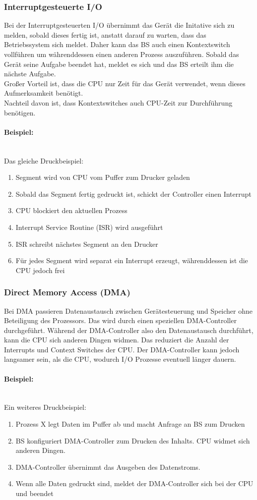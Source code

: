 \documentclass{article}
\newcommand{\paragraphlb}[1]{\paragraph{#1}\mbox{}\\}
\begin{document}
	\subsubsection{Interruptgesteuerte I/O}
	Bei der Interruptgesteuerten I/O übernimmt das Gerät die Initative sich zu melden, sobald dieses fertig ist, anstatt darauf zu warten, dass das Betriebssystem sich meldet. Daher kann das BS auch einen Kontextswitch vollführen um währenddessen einen anderen Prozess auszuführen. Sobald das Gerät seine Aufgabe beendet hat, meldet es sich und das BS erteilt ihm die nächste Aufgabe. \\
	Großer Vorteil ist, dass die CPU nur Zeit für das Gerät verwendet, wenn dieses Aufmerksamkeit benötigt. \\
	Nachteil davon ist, dass Kontextswitches auch CPU-Zeit zur Durchführung benötigen. 
	\paragraphlb{Beispiel:}
	Das gleiche Druckbeispiel:
	\begin{enumerate}
		\item{Segment wird von CPU vom Puffer zum Drucker geladen}
		\item{Sobald das Segment fertig gedruckt ist, schickt der Controller einen Interrupt}
		\item{CPU blockiert den aktuellen Prozess}
		\item{Interrupt Service Routine (ISR) wird ausgeführt}
		\item{ISR schreibt nächstes Segment an den Drucker}
		\item{Für jedes Segment wird separat ein Interrupt erzeugt, währenddessen ist die CPU jedoch frei}
	\end{enumerate}
	\subsubsection{Direct Memory Access (DMA)}
	Bei DMA passieren Datenaustausch zwischen Gerätesteuerung und Speicher ohne Beteiligung des Prozessors. Das wird durch einen speziellen DMA-Controller durchgeführt. Während der DMA-Controller also den Datenaustausch durchführt, kann die CPU sich anderen Dingen widmen. Das reduziert die Anzahl der Interrupts und Context Switches der CPU. Der DMA-Controller kann jedoch langsamer sein, als die CPU, wodurch I/O Prozesse eventuell länger dauern. 
	\paragraphlb{Beispiel:}
	Ein weiteres Druckbeispiel:
	\begin{enumerate}
		\item{Prozess X legt Daten im Puffer ab und macht Anfrage an BS zum Drucken}
		\item{BS konfiguriert DMA-Controller zum Drucken des Inhalts. CPU widmet sich anderen Dingen.}
		\item{DMA-Controller übernimmt das Ausgeben des Datenstroms.}
		\item{Wenn alle Daten gedruckt sind, meldet der DMA-Controller sich bei der CPU und beendet}
	\end{enumerate}
\end{document}
